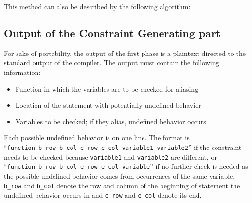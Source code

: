 This method can also be described by the following algorithm:

\noindent{}


\subsection{Output of the Constraint Generating part}
For sake of portability, the output of the first phase is a plaintext directed to the standard output of the compiler. The output must contain the following information:

\begin{itemize}
\item Function in which the variables are to be checked for aliasing
\item Location of the statement with potentially undefined behavior
\item Variables to be checked; if they alias, undefined behavior occurs
\end{itemize}

Each possible undefined behavior is on one line. The format is
\\``\verb|function b_row b_col e_row e_col variable1 variable2|''
if the constraint needs to be checked because \verb|variable1| and \verb|variable2| are different, or
\\``\verb|function b_row b_col e_row e_col variable|''
if no further check is needed as the possible undefined behavior comes from occurrences of the same variable. \verb|b_row| and \verb|b_col| denote the row and column of the beginning of statement the undefined behavior occurs in and \verb|e_row| and \verb|e_col| denote its end.

